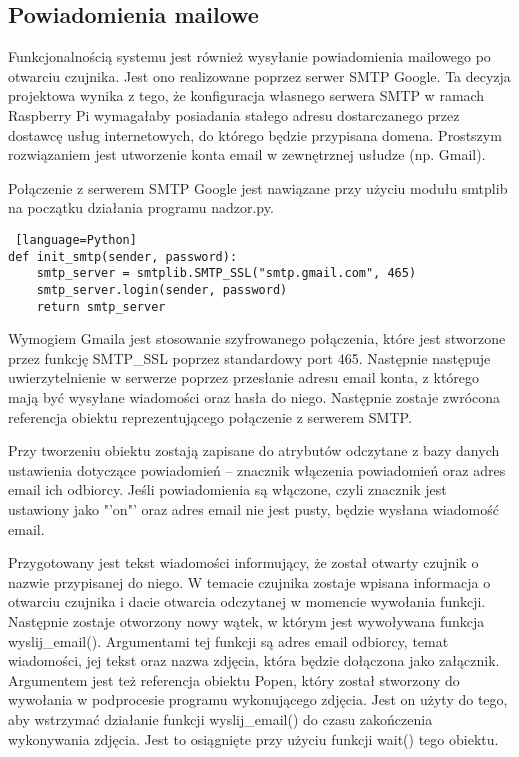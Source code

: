 \documentclass[a4paper,12pt,twoside]{article}
\begin{document}
\subsection{Powiadomienia mailowe}
Funkcjonalnością systemu jest również wysyłanie powiadomienia mailowego po otwarciu czujnika. Jest ono realizowane poprzez serwer SMTP Google. Ta decyzja projektowa wynika z tego, że konfiguracja własnego serwera SMTP w ramach Raspberry Pi wymagałaby posiadania stałego adresu dostarczanego przez dostawcę usług internetowych, do którego będzie przypisana domena. Prostszym rozwiązaniem jest utworzenie konta email w zewnętrznej usłudze (np. Gmail). 

Połączenie z serwerem SMTP Google jest nawiązane przy użyciu modułu smtplib na początku działania programu nadzor.py. 
\begin{lstlisting} [language=Python]
def init_smtp(sender, password):
    smtp_server = smtplib.SMTP_SSL("smtp.gmail.com", 465)
    smtp_server.login(sender, password)
    return smtp_server 
\end{lstlisting}
Wymogiem Gmaila jest stosowanie szyfrowanego połączenia, które jest stworzone przez funkcję SMTP{\_}SSL poprzez standardowy port 465. Następnie następuje uwierzytelnienie w serwerze poprzez przesłanie adresu email konta, z którego mają być wysyłane wiadomości oraz hasła do niego. Następnie zostaje zwrócona referencja obiektu reprezentującego połączenie z serwerem SMTP.

Przy tworzeniu obiektu zostają zapisane do atrybutów odczytane z bazy danych ustawienia dotyczące powiadomień -- znacznik włączenia powiadomień oraz adres email ich odbiorcy. Jeśli powiadomienia są włączone, czyli znacznik jest ustawiony jako "'on"' oraz adres email nie jest pusty, będzie wysłana wiadomość email.

Przygotowany jest tekst wiadomości informujący, że został otwarty czujnik o nazwie przypisanej do niego. W temacie czujnika zostaje wpisana informacja o otwarciu czujnika i dacie otwarcia odczytanej w momencie wywołania funkcji. Następnie zostaje otworzony nowy wątek, w którym jest wywoływana funkcja wyslij{\_}email(). Argumentami tej funkcji są adres email odbiorcy, temat wiadomości, jej tekst oraz nazwa zdjęcia, która będzie dołączona jako załącznik. Argumentem jest też referencja obiektu Popen, który został stworzony do wywołania w podprocesie programu wykonującego zdjęcia. Jest on użyty do tego, aby wstrzymać działanie funkcji wyslij{\_}email() do czasu zakończenia wykonywania zdjęcia. Jest to osiągnięte przy użyciu funkcji wait() tego obiektu.
\end{document}
